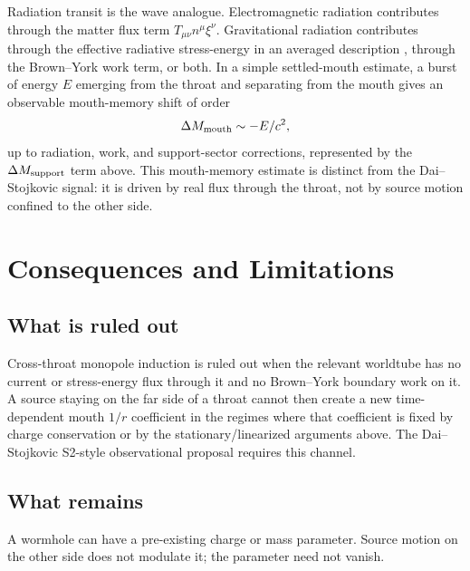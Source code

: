 \documentclass[aps,prd,10pt,onecolumn,nofootinbib,superscriptaddress,floatfix]{revtex4-2}
\begin{document}
Radiation transit is the wave analogue.  Electromagnetic
radiation contributes through the matter flux term
$T_{\mu\nu}n^\mu\xi^\nu$.  Gravitational radiation contributes through the
effective radiative stress-energy in an averaged description
\cite{Isaacson1968EffectiveStressTensor}, through the Brown--York work term, or
both.  In a simple settled-mouth estimate, a burst of energy $E$ emerging from
the throat and separating from the mouth gives an observable mouth-memory shift
of order
\begin{equation}
  \Delta M_{\rm mouth}\sim -E/c^2,
\end{equation}
up to radiation, work, and support-sector corrections, represented by the
$\Delta M_{\rm support}$ term above.  This
mouth-memory estimate is distinct from the Dai--Stojkovic signal: it is
driven by real flux through the throat, not by source motion confined to the
other side.

\section{Consequences and Limitations}
\label{sec:consequences}

\subsection{What is ruled out}

Cross-throat monopole induction is ruled out when the relevant worldtube has
no current or stress-energy flux through it and no Brown--York boundary work
on it.  A source staying on the far side of a throat cannot then create a new
time-dependent mouth $1/r$ coefficient in the regimes where that coefficient
is fixed by charge conservation or by the stationary/linearized arguments
above.
The Dai--Stojkovic S2-style observational proposal requires this channel.

\subsection{What remains}

A wormhole can have a pre-existing charge or mass parameter.  Source motion on
the other side does not modulate it; the parameter need not vanish.
\end{document}
